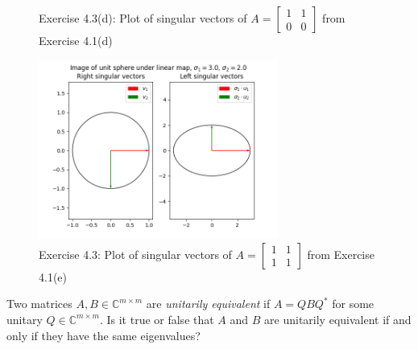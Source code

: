 \documentclass[12pt]{article}
\newenvironment{ex}[2][Exercise]{\begin{trivlist}
		\item[\hskip \labelsep {\bfseries #1}\hskip \labelsep {\bfseries #2.}]}{\end{trivlist}}
\newenvironment{sol}[1][Solution]{\begin{trivlist}
		\item[\hskip \labelsep {\bfseries #1:}]}{\end{trivlist}}
\begin{document}
\begin{sol}
\begin{figure}
		\caption{Exercise 4.3(d): Plot of singular vectors of $A=\begin{bmatrix}
				1 & 1\\
				0 & 0
			\end{bmatrix}$ from Exercise 4.1(d)}
		\label{fig:4.3d}
	\end{figure}
	\begin{figure}
		\centering
		\includegraphics[width=0.7\textwidth]{a_plot_of_singular_vectors}
		\caption{Exercise 4.3: Plot of singular vectors of $A=\begin{bmatrix}
				1 & 1\\
				1 & 1
			\end{bmatrix}$ from Exercise 4.1(e)}
		\label{fig:4.3e}
	\end{figure}
\end{sol}

\begin{ex}{4.4}
	Two matrices $A,B\in\mathbb{C}^{m\times m}$ are \emph{unitarily equivalent} if $A=QBQ^*$ for
	some unitary $Q\in\mathbb{C}^{m\times m}$. Is it true or false that $A$ and $B$ are unitarily
	equivalent if and only if they have the same eigenvalues?
\end{ex}
\end{document}

